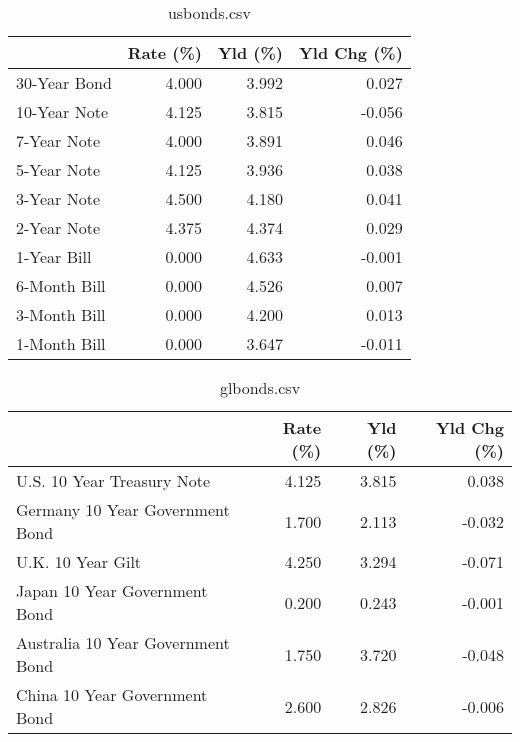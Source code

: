\documentclass{article}%
\begin{document}
%


\begin{table}[htbp]%
\caption{usbonds.csv}%
\centering%
\begin{adjustbox}{width=1\textwidth}%
\begin{tabular}{lrrr}
\toprule
             &  Rate (\%) &  Yld (\%) &  Yld Chg (\%) \\
\midrule
30-Year Bond &     4.000 &    3.992 &        0.027 \\
10-Year Note &     4.125 &    3.815 &       -0.056 \\
 7-Year Note &     4.000 &    3.891 &        0.046 \\
 5-Year Note &     4.125 &    3.936 &        0.038 \\
 3-Year Note &     4.500 &    4.180 &        0.041 \\
 2-Year Note &     4.375 &    4.374 &        0.029 \\
 1-Year Bill &     0.000 &    4.633 &       -0.001 \\
6-Month Bill &     0.000 &    4.526 &        0.007 \\
3-Month Bill &     0.000 &    4.200 &        0.013 \\
1-Month Bill &     0.000 &    3.647 &       -0.011 \\
\bottomrule
\end{tabular}
%
\end{adjustbox}%
\end{table}

%


\begin{table}[htbp]%
\caption{glbonds.csv}%
\centering%
\begin{adjustbox}{width=1\textwidth}%
\begin{tabular}{lrrr}
\toprule
                                  &  Rate (\%) &  Yld (\%) &  Yld Chg (\%) \\
\midrule
       U.S. 10 Year Treasury Note &     4.125 &    3.815 &        0.038 \\
  Germany 10 Year Government Bond &     1.700 &    2.113 &       -0.032 \\
                U.K. 10 Year Gilt &     4.250 &    3.294 &       -0.071 \\
    Japan 10 Year Government Bond &     0.200 &    0.243 &       -0.001 \\
Australia 10 Year Government Bond &     1.750 &    3.720 &       -0.048 \\
    China 10 Year Government Bond &     2.600 &    2.826 &       -0.006 \\
\bottomrule
\end{tabular}
%
\end{adjustbox}%
\end{table}
\end{document}
